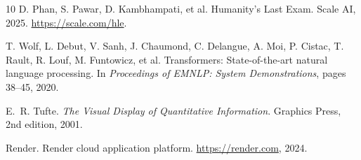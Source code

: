 \documentclass{article}
\begin{document}
\begin{thebibliography}{10}
D. Phan, S. Pawar, D. Kambhampati, et al.
\newblock Humanity's Last Exam.
\newblock Scale AI, 2025.
\newblock \url{https://scale.com/hle}.

T. Wolf, L. Debut, V. Sanh, J. Chaumond, C. Delangue, A. Moi, P. Cistac,
T. Rault, R. Louf, M. Funtowicz, et al.
\newblock Transformers: State-of-the-art natural language processing.
\newblock In \textit{Proceedings of EMNLP: System Demonstrations},
pages 38--45, 2020.

E.~R. Tufte.
\newblock \textit{The Visual Display of Quantitative Information}.
\newblock Graphics Press, 2nd edition, 2001.

Render.
\newblock Render cloud application platform.
\newblock \url{https://render.com}, 2024.

\end{thebibliography}
\end{document}
